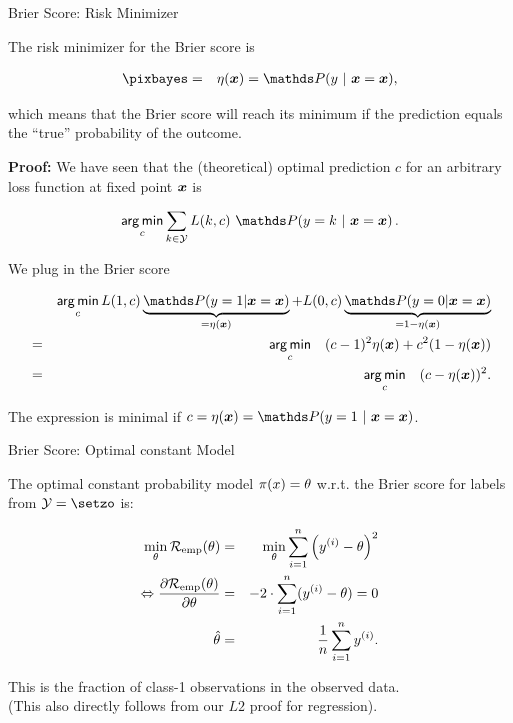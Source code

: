 \begin{vbframe}{Brier Score: Risk Minimizer}

The risk minimizer for the Brier score is 

\begin{eqnarray*}
\pixbayes &=& \eta(\xv) = \P(y~|~\xv = \xv),
\end{eqnarray*}

which means that the Brier score will reach its minimum if the prediction equals the \enquote{true} probability of the outcome. 

\lz 

\textbf{Proof: }We have seen that the (theoretical) optimal prediction $c$ for an arbitrary loss function at fixed point $\bm{x}$ is

$$
\argmin_{c} \sum_{k \in \Yspace} L(k, c) ~ \P(y = k~|~ \xv = \xv)\,.
$$

We plug in the Brier score

\vspace*{-0.3cm}

\begin{eqnarray*}
	&& \argmin_c L(1, c) \underbrace{\P(y = 1| \xv = \xv)}_{= \eta(\xv)} + L(0, c) \underbrace{\P(y = 0| \xv = \xv)}_{= 1 - \eta(\xv)} \\ 
	&=&  \argmin_c \quad (c - 1)^2 \eta(\xv) + c^2 (1 - \eta(\xv))\\
	&=&  \argmin_c \quad (c - \eta(\xv))^2.
\end{eqnarray*}

The expression is minimal if $c = \eta(\xv) = \P(y = 1~|~\xv = \xv)$.

\end{vbframe}

\begin{vbframe}{Brier Score: Optimal constant Model}

The optimal constant probability model $\pi(x) = \theta$ w.r.t. the Brier score for labels from $\Yspace = \setzo$ is:

\begin{eqnarray*}
  \min_{\theta} \mathcal{R}_{\text{emp}}(\theta) &=& \min_{\theta} \sum_{i=1}^n \left(y^{(i)} - \theta\right)^2 \\
  \Leftrightarrow \frac{\partial \mathcal{R}_{\text{emp}}(\theta)}{\partial \theta} &=& - 2 \cdot \sum_{i=1}^n (y^{(i)} - \theta) = 0 \\
  \hat \theta &=& \frac{1}{n} \sum_{i=1}^n y^{(i)}.   
\end{eqnarray*}

This is the fraction of class-1 observations in the observed data.\\
(This also directly follows from our $L2$ proof for regression).

\end{vbframe}

